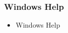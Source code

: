 \begin{frame}
\frametitle{Windows Help}
\begin{itemize}
	\item Windows Help
\end{itemize}

\end{frame}

